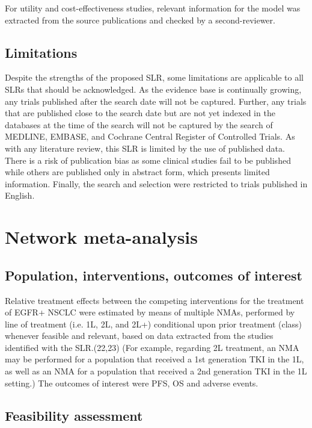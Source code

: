 \documentclass[11pt,final,fleqn]{article}\usepackage[]{graphicx}\usepackage[]{color}
\theoremstyle{plain}
\begin{document}
{\begin{appendices}
For utility and cost-effectiveness studies, relevant information for the model was extracted from the source publications and checked by a second-reviewer. 

\subsection{Limitations}

Despite the strengths of the proposed SLR, some limitations are applicable to all SLRs that should be acknowledged. As the evidence base is continually growing, any trials published after the search date will not be captured. Further, any trials that are published close to the search date but are not yet indexed in the databases at the time of the search will not be captured by the search of MEDLINE, EMBASE, and Cochrane Central Register of Controlled Trials. As with any literature review, this SLR is limited by the use of published data. There is a risk of publication bias as some clinical studies fail to be published while others are published only in abstract form, which presents limited information. Finally, the search and selection were restricted to trials published in English.

\section{Network meta-analysis}

\subsection{Population, interventions, outcomes of interest}

Relative treatment effects between the competing interventions for the treatment of EGFR+ NSCLC were estimated by means of multiple NMAs, performed by line of treatment (i.e. 1L, 2L, and 2L+) conditional upon prior treatment (class) whenever feasible and relevant, based on data extracted from the studies identified with the SLR.(22,23) (For example, regarding 2L treatment, an NMA may be performed for a population that received a 1st generation TKI in the 1L, as well as an NMA for a population that received a 2nd generation TKI in the 1L setting.) The outcomes of interest were PFS, OS and adverse events. 

\subsection{Feasibility assessment}


\end{appendices}}
\end{document}
